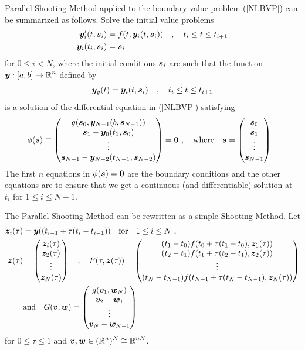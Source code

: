Parallel Shooting Method applied to the boundary value problem
(\ref{NLBVP}) can be summarized as follows.  Solve the initial value
problems
\begin{align*}
\bm{y}_i'(t, \bm{s}_i) &= f(t,\bm{y}_i(t,\bm{s}_i))
\quad , \quad t_i \leq t \leq t_{i+1} \\
\bm{y}_i(t_i,\bm{s}_i) &= \bm{s}_i
\end{align*}
for $0\leq i < N$, where the initial conditions $\bm{s}_i$ are
such that the function $\displaystyle \bm{y}:[a,b]\to \mathbb{R}^n$ defined by
\[
\bm{y}_g(t)= \bm{y}_i(t,\bm{s}_i) \quad , \quad t_i \leq t \leq t_{i+1}
\]
is a solution of the differential equation in (\ref{NLBVP}) satisfying
\[
\phi(\VEC{s}) \equiv \begin{pmatrix}
g(\VEC{s}_0,\VEC{y}_{N-1}(b,\VEC{s}_{N-1})) \\
\VEC{s}_1 - \VEC{y}_0(t_1,\VEC{s}_0) \\
\vdots \\
\VEC{s}_{N-1} - \VEC{y}_{N-2}(t_{N-1},\VEC{s}_{N-2})
\end{pmatrix}
= \VEC{0} \ , \quad \text{where} \quad 
\VEC{s} = \begin{pmatrix}
\VEC{s}_0 \\ \VEC{s}_1 \\ \vdots \\ \VEC{s}_{N-1} \end{pmatrix} \ .
\]
The first $n$ equations in $\phi(\bm{s}) = \bm{0}$ are the boundary
conditions and the other equations are to ensure that we get a
continuous (and differentiable) solution at $t_i$ for $1\leq i \leq N-1$.

The Parallel Shooting Method can be rewritten as a simple Shooting
Method.  Let
\begin{align*}
\bm{z}_i(\tau) &= \bm{y}((t_{i-1} + \tau (t_i - t_{i-1})) \quad
\text{for} \quad 1 \leq i \leq N \ , \\ 
\bm{z}(\tau) &= \begin{pmatrix}
\bm{z}_i(\tau) \\ \bm{z}_2(\tau) \\ \vdots \\ \bm{z}_N(\tau)
\end{pmatrix} \quad , \quad
F(\tau,\bm{z}(\tau)) = \begin{pmatrix}
(t_1 - t_0 ) f(t_0+\tau (t_1-t_0),\bm{z}_1(\tau)) \\
(t_2 - t_1 ) f(t_1+\tau (t_2-t_1),\bm{z}_2(\tau)) \\
\vdots \\
(t_N - t_{N-1} ) f(t_{N-1}+\tau (t_N-t_{N-1}),\bm{z}_N(\tau))
\end{pmatrix} \\
& \text{and}  \quad G(\bm{v},\bm{w}) = \begin{pmatrix}
g(\bm{v}_1,\bm{w}_N) \\
\bm{v}_2 - \bm{w}_1 \\
\vdots \\
\bm{v}_N - \bm{w}_{N-1}
\end{pmatrix}
\end{align*}
for $0 \leq \tau \leq 1$ and
$\displaystyle \bm{v}, \bm{w} \in (\mathbb{R}^n)^N \cong \mathbb{R}^{nN}$.

